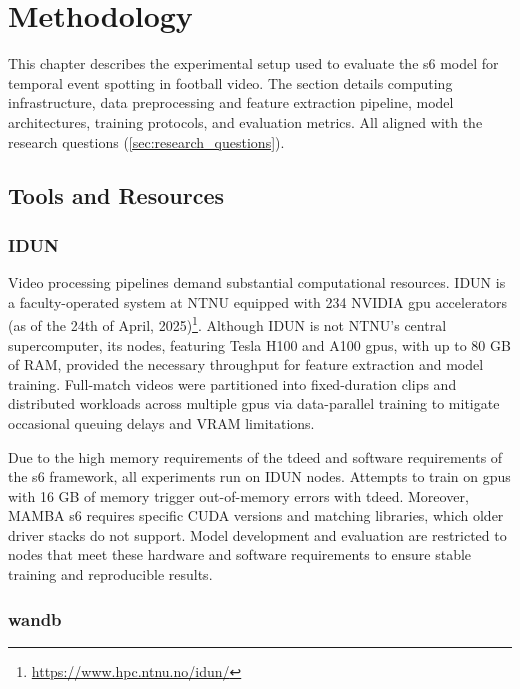 \chapter{Methodology} 
\label{chap:methodology}
This chapter describes the experimental setup used to evaluate the \acrfull{s6} model for temporal event spotting in football video. The section details computing infrastructure, data preprocessing and feature extraction pipeline, model architectures, training protocols, and evaluation metrics. All aligned with the research questions (\autoref{sec:research_questions}).


\section{Tools and Resources}
\label{sec:tools_and_resources}

\subsection{IDUN}
\label{ssec:idun}
Video processing pipelines demand substantial computational resources. IDUN is a faculty-operated system at NTNU equipped with 234 NVIDIA \acrfull{gpu} accelerators (as of the 24th of April, 2025)\footnote{\url{https://www.hpc.ntnu.no/idun/}}. Although IDUN is not NTNU's central supercomputer, its nodes, featuring Tesla H100 and A100 \acrshort{gpu}s, with up to 80 GB of RAM, provided the necessary throughput for feature extraction and model training. Full-match videos were partitioned into fixed-duration clips and distributed workloads across multiple \acrshort{gpu}s via data-parallel training to mitigate occasional queuing delays and VRAM limitations.

Due to the high memory requirements of the \acrfull{tdeed} and software requirements of the \acrfull{s6} framework, all experiments run on IDUN nodes. Attempts to train on \acrshort{gpu}s with 16 GB of memory trigger out-of-memory errors with \acrshort{tdeed}. Moreover, MAMBA \acrshort{s6} requires specific CUDA versions and matching libraries, which older driver stacks do not support. Model development and evaluation are restricted to nodes that meet these hardware and software requirements to ensure stable training and reproducible results. 



\subsection{\acrfull{wandb}}
\label{ssec:wandb}

